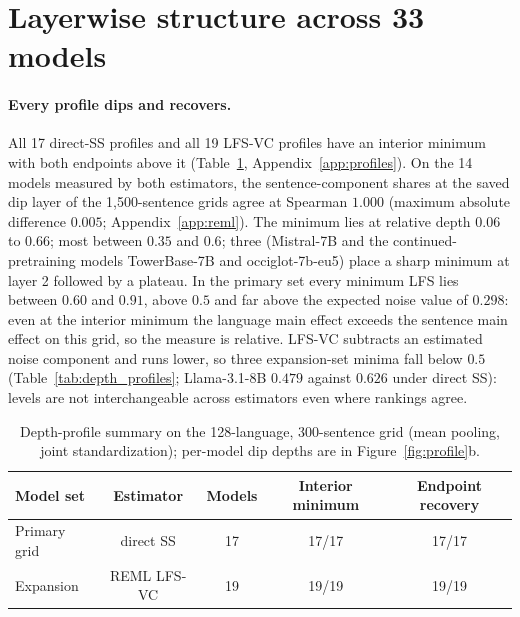 \documentclass{article} %
\begin{document}
\section{Layerwise structure across 33 models}
\label{sec:structure}


\paragraph{Every profile dips and recovers.} All 17 direct-SS profiles and all
19 LFS-VC profiles have an interior minimum with both endpoints above it
(Table~\ref{tab:profiles}, Appendix~\ref{app:profiles}).
On the 14 models measured by both estimators, the sentence-component shares at the saved dip layer of the 1,500-sentence grids agree at Spearman $1.000$ (maximum absolute difference $0.005$; Appendix~\ref{app:reml}). The minimum lies at relative depth $0.06$ to $0.66$; most between $0.35$ and $0.6$; three (Mistral-7B and the continued-pretraining models TowerBase-7B and occiglot-7b-eu5) place a sharp minimum at layer 2 followed by a plateau. In the primary set every minimum LFS lies between $0.60$ and $0.91$, above $0.5$ and far above the expected noise value of $0.298$: even at the interior minimum the language main effect exceeds the sentence main effect on this grid, so the measure is relative. LFS-VC subtracts an estimated noise component and runs lower, so three expansion-set minima fall below $0.5$ (Table~\ref{tab:depth_profiles}; Llama-3.1-8B $0.479$ against $0.626$ under direct SS): levels are not interchangeable across estimators even where rankings agree.

\begin{table}[t]
\caption{Depth-profile summary on the 128-language, 300-sentence grid (mean pooling, joint standardization); per-model dip depths are in Figure~\ref{fig:profile}b.}
\label{tab:profiles}
\begin{center}
\small
\begin{tabular}{lcccc}
\toprule
Model set & Estimator & Models & Interior minimum & Endpoint recovery \\
\midrule
Primary grid & direct SS & 17 & 17/17 & 17/17 \\
Expansion & REML LFS-VC & 19 & 19/19 & 19/19 \\
\midrule
\bottomrule
\end{tabular}
\end{center}
\end{table}
\end{document}
